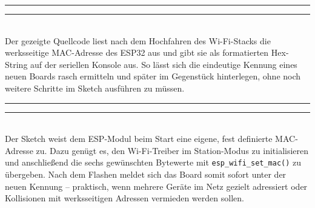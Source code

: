 \documentclass[a4paper,12pt]{article}
\begin{document}
\newpage
\noindent\rule{\linewidth}{0.4pt}  %

\noindent\rule{\linewidth}{0.4pt}  %
\\[-0.8em]

Der gezeigte Quellcode liest nach dem Hochfahren des Wi-Fi-Stacks die werksseitige MAC-Adresse des ESP32 aus und gibt sie als formatierten Hex-String auf der seriellen Konsole aus. So lässt sich die eindeutige Kennung eines neuen Boards rasch ermitteln und später im Gegenstück hinterlegen, ohne noch weitere Schritte im Sketch ausführen zu müssen.

\noindent\rule{\linewidth}{0.4pt}  %

\noindent\rule{\linewidth}{0.4pt}  %
\\[-0.8em]

Der Sketch weist dem ESP-Modul beim Start eine eigene, fest definierte MAC-Adresse zu. Dazu genügt es, den Wi-Fi-Treiber im Station-Modus zu initialisieren und anschließend die sechs gewünschten Bytewerte mit \verb|esp_wifi_set_mac()| zu übergeben. Nach dem Flashen meldet sich das Board somit sofort unter der neuen Kennung – praktisch, wenn mehrere Geräte im Netz gezielt adressiert oder Kollisionen mit werksseitigen Adressen vermieden werden sollen.
\end{document}
